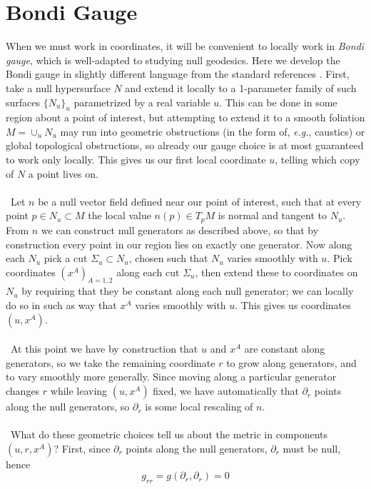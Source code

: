 \documentclass[11pt,letterpaper]{article}
\newcommand{\D}{\partial}
\begin{document}
\section{Bondi Gauge}
When we must work in coordinates, it will be convenient to locally work in \textit{Bondi gauge}, which is well-adapted to studying null geodesics. Here we develop the Bondi gauge in slightly different language from the standard references \cite{Strominger:2017zoo, Sachs:1962zza, Sachs:1962wk}. First, take a null hypersurface $N$ and extend it locally to a 1-parameter family of such surfaces $\{N_u\}_u$ parametrized by a real variable $u$. This can be done in some region about a point of interest, but attempting to extend it to a smooth foliation $M = \cup_u N_u$ may run into geometric obstructions (in the form of, \textit{e.g.}, caustics) or global topological obstructions, so already our gauge choice is at most guaranteed to work only locally. This gives us our first local coordinate $u$, telling which copy of $N$ a point lives on.\\
\\
\
Let $n$ be a null vector field defined near our point of interest, such that at every point $p \in N_u \subset M$ the local value $n(p) \in T_p M$ is normal and tangent to $N_u$. From $n$ we can construct null generators as described above, so that by construction every point in our region lies on exactly one generator. Now along each $N_u$ pick a cut $\Sigma_u \subset N_u$, chosen such that $N_u$ varies smoothly with $u$. Pick coordinates $(x^A)_{A = 1,2}$ along each cut $\Sigma_u$, then extend these to coordinates on $N_u$ by requiring that they be constant along each null generator; we can locally do so in such as way that $x^A$ varies smoothly with $u$. This gives us coordinates $(u, x^A)$.\\
\\
\
At this point we have by construction that $u$ and $x^A$ are constant along generators, so we take the remaining coordinate $r$ to grow along generators, and to vary smoothly more generally. Since moving along a particular generator changes $r$ while leaving $(u, x^A)$ fixed, we have automatically that $\D_r$ points along the null generators, so $\D_r$ is some local rescaling of $n$. \\
\\
\
What do these geometric choices tell us about the metric in components $(u, r, x^A)$? First, since $\D_r$ points along the null generators, $\D_r$ must be null, hence \begin{equation}
g_{rr} = g(\D_r, \D_r) = 0
\end{equation}
\end{document}
